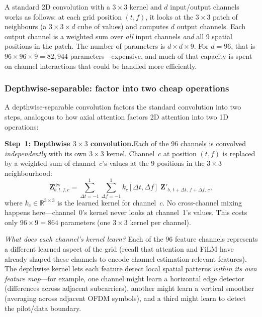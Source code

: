 \documentclass[11pt,a4paper]{article}
\begin{document}
	A standard 2D convolution with a $3 \times 3$ kernel and $d$ input/output channels works as follows: at each grid position $(t,f)$, it looks at the $3 \times 3$ patch of neighbours (a $3 \times 3 \times d$ cube of values) and computes $d$ output channels.  Each output channel is a weighted sum over \emph{all} input channels \emph{and} all 9 spatial positions in the patch.  The number of parameters is $d \times d \times 9$.  For $d\!=\!96$, that is $96 \times 96 \times 9 = 82{,}944$ parameters---expensive, and much of that capacity is spent on channel interactions that could be handled more efficiently.
	
	\subsubsection*{Depthwise-separable: factor into two cheap operations}
	
	A depthwise-separable convolution factors the standard convolution into two steps, analogous to how axial attention factors 2D attention into two 1D operations:
	
	\medskip\noindent
	\textbf{Step~1: Depthwise $3 \times 3$ convolution.}\quad Each of the 96 channels is convolved \emph{independently} with its own $3 \times 3$ kernel.  Channel~$c$ at position $(t,f)$ is replaced by a weighted sum of channel~$c$'s values at the 9 positions in the $3 \times 3$ neighbourhood:
	\begin{equation}
		\mathbf{Z}^{\mathrm{dw}}_{b,t,f,c} = \sum_{\Delta t=-1}^{1}\sum_{\Delta f=-1}^{1} k_c[\Delta t, \Delta f]\;\mathbf{Z}'_{b,\,t+\Delta t,\,f+\Delta f,\,c},
		\label{eq:dwconv}
	\end{equation}
	where $k_c \in \mathbb{R}^{3 \times 3}$ is the learned kernel for channel~$c$.  No cross-channel mixing happens here---channel~0's kernel never looks at channel~1's values.  This costs only $96 \times 9 = 864$ parameters (one $3 \times 3$ kernel per channel).
	
	\emph{What does each channel's kernel learn?}  Each of the 96 feature channels represents a different learned aspect of the grid (recall that attention and FiLM have already shaped these channels to encode channel estimation-relevant features).  The depthwise kernel lets each feature detect local spatial patterns \emph{within its own feature map}---for example, one channel might learn a horizontal edge detector (differences across adjacent subcarriers), another might learn a vertical smoother (averaging across adjacent OFDM symbols), and a third might learn to detect the pilot/data boundary.
	
\end{document}
